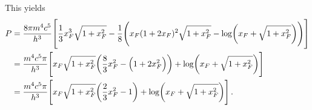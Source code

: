 \documentclass[main.tex]{subfiles}
\begin{document}
This yields 
%
\begin{align}
P &= \frac{8 \pi m^4 c^{5}}{h^3} \qty[ 
    \frac{1}{3} x_F^3 \sqrt{1 + x_F^2 } 
    - \frac{1}{8} \qty(x_F (1 + 2 x_F)^2 \sqrt{1 + x_F^2} 
    - \log(x_F + \sqrt{1 + x_F^2}))
]  \\
&= \frac{m^4 c^{5} \pi }{h^3}
\qty[
    x_F \sqrt{1 + x_F^2}
    \qty( \frac{8}{3} x_F^2 - \qty(1 + 2 x_F^2))
    + \log(x_F + \sqrt{1 + x_F^2})
]  \\
&= \frac{m^4 c^{5} \pi }{h^3} \qty[
    x_F \sqrt{1+ x_F^2} 
    \qty( \frac{2}{3} x_F^2 - 1)
    +
    \log(x_F + \sqrt{1 + x_F^2})
]
\,.
\end{align}
\end{document}
